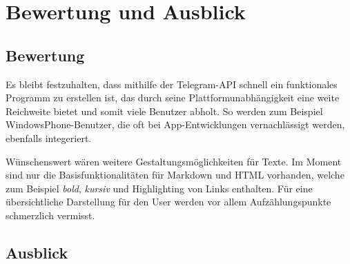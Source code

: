 \chapter{Bewertung und Ausblick}
\section{Bewertung}
Es bleibt festzuhalten, dass mithilfe der Telegram-API schnell ein funktionales Programm zu erstellen ist, das durch seine Plattformunabhängigkeit eine weite Reichweite bietet und somit viele Benutzer abholt. So werden zum Beispiel WindowsPhone-Benutzer, die oft bei App-Entwicklungen vernachlässigt werden, ebenfalls integeriert.

Wünschenswert wären weitere Gestaltungsmöglichkeiten für Texte. Im Moment sind nur die Basisfunktionalitäten für Markdown und HTML vorhanden, welche zum Beispiel \emph{bold}, \emph{kursiv} und Highlighting von Links enthalten.
Für eine übersichtliche Darstellung für den User werden vor allem Aufzählungspunkte schmerzlich vermisst.


\section{Ausblick}
